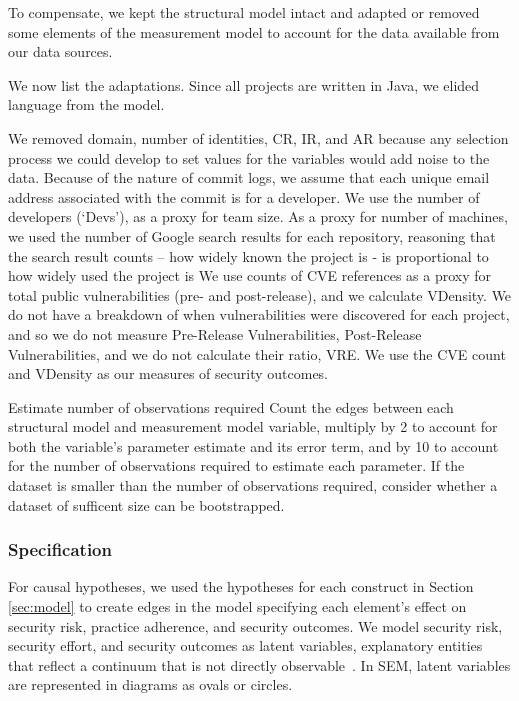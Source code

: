 To compensate, we kept the structural model intact and adapted or removed some elements of the measurement model to account for the data available from our data sources. 

We now list the adaptations. Since all projects are written in Java, we elided language from the model. 

We removed domain, number of identities, CR, IR, and AR because any selection process we could develop to set values for the variables would add noise to the data. Because of the nature of commit logs, we assume that each unique email address associated with the commit is for a developer. We use the number of developers (‘Devs’), as a proxy for team size. As a proxy for number of machines, we used the number of Google  search results for each repository, reasoning that the search result counts – how widely known the project is - is proportional to how widely used the project is We use counts of CVE references as a proxy for total public vulnerabilities (pre- and post-release), and we calculate VDensity. We do not have a breakdown of when vulnerabilities were discovered for each project, and so we do not measure Pre-Release Vulnerabilities, Post-Release Vulnerabilities, and we do not calculate their ratio, VRE. We use the CVE count and VDensity as our measures of security outcomes. 


\item Estimate number of observations required
Count the edges between each structural model and measurement model variable, multiply by 2 to account for both the variable's parameter estimate and its error term, and by 10 to account for the number of observations required to estimate each parameter. If the dataset is smaller than the number of observations required, consider whether a dataset of sufficent size can be bootstrapped.


\subsubsection{Specification}
For causal hypotheses, we used the hypotheses for each construct in Section \ref{sec:model} to create edges in the model specifying each element’s effect on security risk, practice adherence, and security outcomes.  We model security risk, security effort, and security outcomes as latent variables, explanatory entities that reflect a continuum that is not directly observable~\cite{kline2015principles}. In SEM, latent variables are represented in diagrams as ovals or circles.

